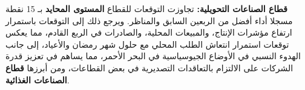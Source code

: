 \textbf{قطاع الصناعات التحويلية:} تجاوزت التوقعات للقطاع \textbf{المستوى المحايد} بـ 15 نقطة مسجلا أداء أفضل من الربعين السابق والمناظر. ويرجع ذلك إلى التوقعات باستمرار ارتفاع مؤشرات الإنتاج، والمبيعات المحلية، والصادرات في الربع القادم، مما يعكس توقعات استمرار انتعاش الطلب المحلي مع حلول شهر رمضان والأعياد، إلى جانب الهدوء النسبي في الأوضاع الجيوسياسية في البحر الأحمر، مما يساهم في تعزيز قدرة الشركات على الالتزام بالتعاقدات التصديرية في بعض القطاعات، ومن أبرزها \textbf{قطاع الصناعات الغذائية}.
